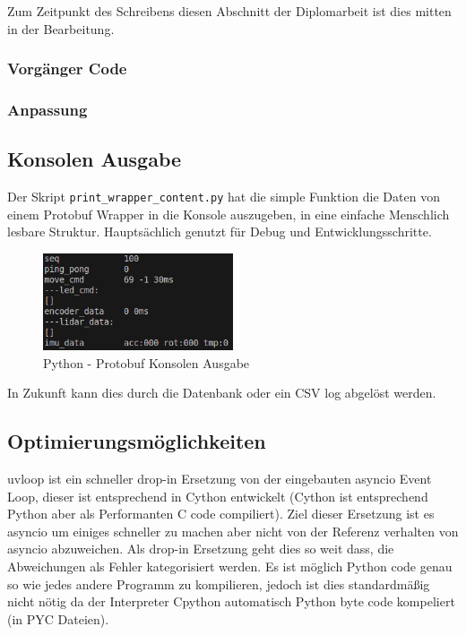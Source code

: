 Zum Zeitpunkt des Schreibens diesen Abschnitt der Diplomarbeit ist dies mitten in der Bearbeitung.
\subsubsection{Vorgänger Code}

\subsubsection{Anpassung}

\subsection{Konsolen Ausgabe}
Der Skript \texttt{print\_wrapper\_content.py} hat die simple Funktion 
die Daten von einem Protobuf Wrapper in die Konsole auszugeben, 
in eine einfache Menschlich lesbare Struktur. 
Hauptsächlich genutzt für Debug und Entwicklungsschritte.

\begin{figure}[H]
    \includegraphics[width=0.5\textwidth, center]{img/Backend/print_wrapper_all.png}
    \caption{Python - Protobuf Konsolen Ausgabe}
    \label{fig:py_konsole_o}
\end{figure}

In Zukunft kann dies durch die Datenbank oder ein CSV log abgelöst werden.

\subsection{Optimierungsmöglichkeiten}
\label{subsec:Optimierungsmöglichkeiten}
uvloop ist ein schneller drop-in Ersetzung von der eingebauten asyncio Event Loop, 
dieser ist entsprechend in Cython entwickelt (Cython ist entsprechend Python aber als Performanten C code compiliert).
Ziel dieser Ersetzung ist es asyncio um einiges schneller zu machen aber nicht von der Referenz verhalten von asyncio abzuweichen. 
Als drop-in Ersetzung geht dies so weit dass, die Abweichungen als Fehler kategorisiert werden.
Es ist möglich Python code genau so wie jedes andere Programm zu kompilieren,
jedoch ist dies standardmäßig nicht nötig da der Interpreter Cpython automatisch Python byte code kompeliert (in PYC Dateien).

